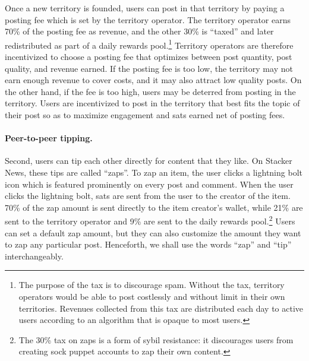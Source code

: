 Once a new territory is founded, users can post in that territory by paying a posting fee which is set by the territory operator. The territory operator earns 70\% of the posting fee as revenue, and the other 30\% is ``taxed'' and later redistributed as part of a daily rewards pool.\footnote{The purpose of the tax is to discourage spam. Without the tax, territory operators would be able to post costlessly and without limit in their own territories. Revenues collected from this tax are distributed each day to active users according to an algorithm that is opaque to most users.} Territory operators are therefore incentivized to choose a posting fee that optimizes between post quantity, post quality, and revenue earned. If the posting fee is too low, the territory may not earn enough revenue to cover costs, and it may also attract low quality posts. On the other hand, if the fee is too high, users may be deterred from posting in the territory. Users are incentivized to post in the territory that best fits the topic of their post so as to maximize engagement and sats earned net of posting fees. %

\paragraph{Peer-to-peer tipping.} Second, users can tip each other directly for content that they like. 
On Stacker News, these tips are called ``zaps''. To zap an item, the user clicks a lightning bolt icon which is featured prominently on every post and comment. When the user clicks the lightning bolt, sats are sent from the user to the creator of the item. 70\% of the zap amount is sent directly to the item creator's wallet, while 21\% are sent to the territory operator and 9\% are sent to the daily rewards pool.\footnote{The 30\% tax on zaps is a form of sybil resistance: it discourages users from creating sock puppet accounts to zap their own content.} Users can set a default zap amount, but they can also customize the amount they want to zap any particular post. Henceforth, we shall use the words ``zap'' and ``tip'' interchangeably. 

